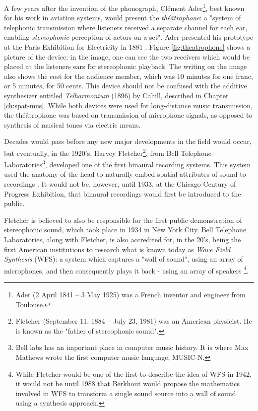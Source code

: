 A few years after the invention of the phonograph, Clément Ader\footnote{Ader (2 April 1841 – 3 May 1925) was a French inventor and engineer from Toulouse.}, best known for his work in aviation systems, would present the \textit{théâtrophone}: a "system of telephonic transmission where listeners received a separate channel for each ear, enabling \textit{stereophonic} perception of actors on a set". Ader presented his prototype at the Paris Exhibition for Electricity in 1881 \cite{malham19953}. Figure \ref{fig:theatrophone} shows a picture of the device; in the image, one can see the two receivers which would be placed at the listeners ears for stereophonic playback. The writing on the image also shows the cost for the audience member, which was 10 minutes for one franc, or 5 minutes, for 50 cents. This device should not be confused with the additive synthesizer entitled \textit{Telharmonium} (1896) by Cahill, described in Chapter \ref{ch:spat-mus}. While both devices were used for long-distance music transmission, the théâtrophone was based on transmission of microphone signals, as opposed to synthesis of musical tones via electric means. 

Decades would pass before any new major developments in the field would occur, but eventually, in the 1920's, Harvey Fletcher\footnote{Fletcher (September 11, 1884 – July 23, 1981) was an American physicist. He is known as the "father of stereophonic sound".}, from Bell Telephone Laboratories\footnote{Bell labs has an important place in computer music history. It is where Max Mathews wrote the first computer music language, MUSIC-N.}, developed one of the first binaural recording systems. This system used the anatomy of the head to naturally embed spatial attributes of sound to recordings \cite{harvey1927binaural}. It would not be, however, until 1933, at the Chicago Century of Progress Exhibition, that binaural recordings would first be introduced to the public. 

Fletcher is believed to also be responsible for the first public demonstration of stereophonic sound, which took place in 1934 in New York City. Bell Telephone Laboratories, along with Fletcher, is also accredited for, in the 20's, being the first American institutions to research what is known today as \textit{Wave Field Synthesis} (WFS): a system which captures a "wall of sound", using an array of microphones, and then consequently plays it back - using an array of speakers \cite{fletcher1942hearing}\footnote{While Fletcher would be one of the first to describe the idea of WFS in 1942, it would not be until 1988 that Berkhout would propose the mathematics involved in WFS to transform a single sound source into a wall of sound using a synthesis approach.}.

